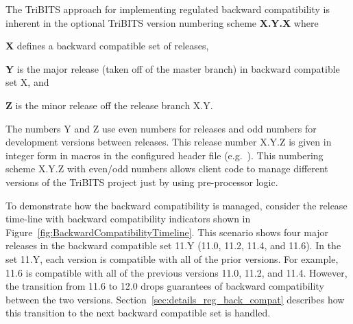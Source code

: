 \documentclass[11pt]{SANDreport}
\begin{document}
The TriBITS approach for implementing regulated backward compatibility
is inherent in the optional TriBITS version numbering scheme
{}\textbf{X.Y.X} where
%
\begin{compactitem}
%
{}\item\textbf{X} defines a backward compatible set of releases,
%
{}\item\textbf{Y} is the major release (taken off of the master
branch) in backward compatible set X, and
%
{}\item\textbf{Z} is the minor release off the release branch X.Y.
%
\end{compactitem}

\begin{figure}
\begin{center}
\end{center}
\end{figure}

The numbers Y and Z use even numbers for releases and odd numbers for
development versions between releases.  This release number X.Y.Z is
given in integer form in macros in the configured header file
{} (e.g.\ {}).
This numbering scheme X.Y.Z with even/odd numbers allows client code
to manage different versions of the TriBITS project just by using
pre-processor logic.

To demonstrate how the backward compatibility is managed, consider the
release time-line with backward compatibility indicators shown in
Figure~\ref{fig:BackwardCompatibilityTimeline}.  This scenario shows
four major releases in the backward compatible set 11.Y (11.0, 11.2,
11.4, and 11.6).  In the set 11.Y, each version is compatible with all
of the prior versions.  For example, 11.6 is compatible with all of
the previous versions 11.0, 11.2, and 11.4.  However, the transition
from 11.6 to 12.0 drops guarantees of backward compatibility between
the two versions.  Section~\ref{sec:details_reg_back_compat} describes
how this transition to the next backward compatible set is handled.
\end{document}
